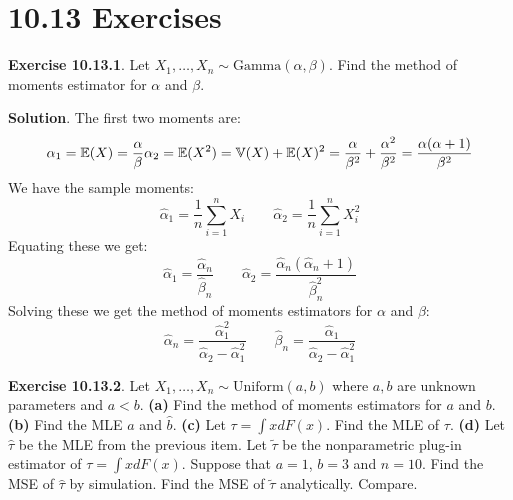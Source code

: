 \section*{10.13 Exercises}

\textbf{Exercise 10.13.1}. Let
\(X_{1}, \dots, X_{n} \sim \text{Gamma}(\alpha, \beta)\). Find the method of
moments estimator for \(\alpha\) and \(\beta\).

\textbf{Solution}.
The first two moments are:
\[
\alpha_{1} = \operatorname{\mathbb{E}}(X) = \frac{\alpha}{\beta}\\
\alpha_{2} = \operatorname{\mathbb{E}}(X^{2}) = \operatorname{\mathbb{V}}(X) + \operatorname{\mathbb{E}}(X)^{2} = \frac{\alpha}{\beta^{2}} + \frac{\alpha^{2}}{\beta^{2}} = \frac{\alpha(\alpha + 1)}{\beta^{2}} 
\]
We have the sample moments:
\[
\hat{\alpha}_{1} = \frac{1}{n}\sum_{i=1}^{n} X_{i}
\quad \quad
\hat{\alpha}_{2} = \frac{1}{n}\sum_{i=1}^{n} X_{i}^{2}
\]
Equating these we get:
\[
\hat{\alpha}_{1} = \frac{\hat{\alpha}_{n}}{\hat{\beta}_{n}}
\quad \quad
\hat{\alpha}_{2} = \frac{\hat{\alpha}_{n}(\hat{\alpha}_{n} + 1)}{\hat{\beta}_{n}^{2}}
\]
Solving these we get the method of moments estimators for \(\alpha\) and
\(\beta\):
\[
\hat{\alpha}_{n} = \frac{\hat{\alpha}_{1}^{2}}{\hat{\alpha}_{2} - \hat{\alpha}_{1}^{2}}
\quad \quad
\hat{\beta}_{n} = \frac{\hat{\alpha}_{1}}{\hat{\alpha}_{2} - \hat{\alpha}_{1}^{2}}
\]

\textbf{Exercise 10.13.2}. Let
\(X_{1}, \dots, X_{n} \sim \text{Uniform}(a, b)\) where \(a, b\) are unknown
parameters and \(a < b\).
\textbf{(a)} Find the method of moments estimators for \(a\) and \(b\).
\textbf{(b)} Find the MLE \(\hat{a}\) and \(\hat{b}\).
\textbf{(c)} Let \(\tau = \int x dF(x)\). Find the MLE of \(\tau\).
\textbf{(d)} Let \(\hat{\tau}\) be the MLE from the previous item. Let
\(\tilde{\tau}\) be the nonparametric plug-in estimator of
\(\tau = \int x dF(x)\). Suppose that \(a = 1\), \(b = 3\) and
\(n = 10\). Find the MSE of \(\hat{\tau}\) by simulation. Find the MSE
of \(\tilde{\tau}\) analytically. Compare.

